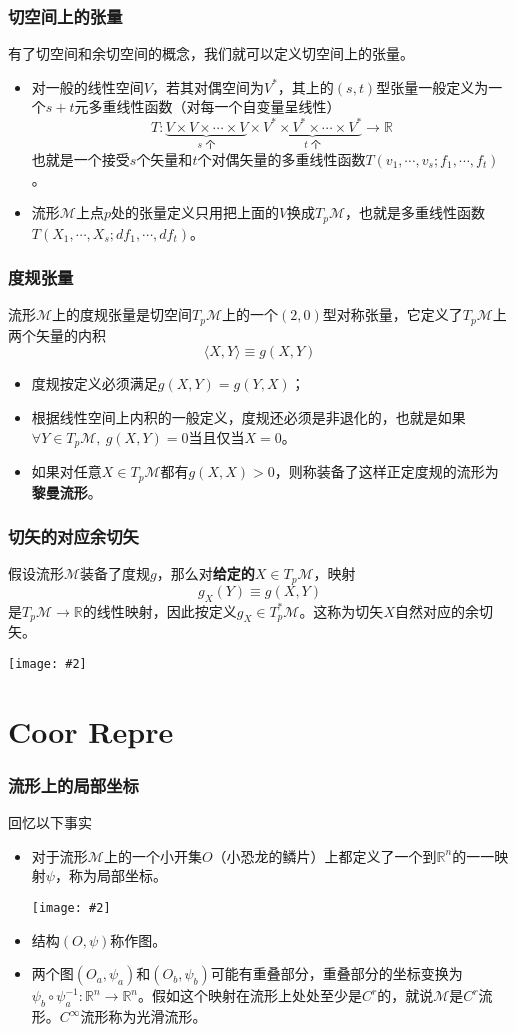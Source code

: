 \documentclass[CJK]{beamer}
\newcommand{\reals}{\mathbb{R}}
\newcommand{\mani}{\mathcal{M}}
\newcommand{\cpic}[2]{
\begin{center}
\texttt{[image: \#2]}
\end{center}
}
\begin{document}
\begin{frame}
\frametitle{\bch 切空间上的张量 \ech}
\bch
有了切空间和余切空间的概念，我们就可以定义切空间上的张量。
\begin{itemize}
\item 对一般的线性空间$V$，若其对偶空间为$V^*$，其上的$(s,t)$型张量一般定义为一个$s+t$元多重线性函数（对每一个自变量呈线性）{\color{blue}
$$
T:\underbrace{V\times V\times \cdots \times V}_{s\text{ 个}} \times  \underbrace{V^* \times V^* \times \cdots \times V^*}_{t\text{ 个}} \to \reals
$$}
也就是一个接受$s$个矢量和$t$个对偶矢量的多重线性函数$T(v_1,\cdots,v_s;f_1,\cdots,f_t)$。
\item 流形$\mani$上点$p$处的张量定义只用把上面的$V$换成$T_p\mani$，也就是多重线性函数$T(X_1,\cdots,X_s;df_1,\cdots,df_t)$。
\end{itemize}
\ech
\end{frame}

\begin{frame}
\frametitle{\bch 度规张量 \ech}
\bch
流形$\mani$上的度规张量是切空间$T_p\mani$上的一个$(2,0)$型对称张量，它定义了$T_p \mani$上两个矢量的内积
$$
\langle X,Y\rangle \equiv g(X,Y)
$$
\begin{itemize}
\item 度规按定义必须满足$g(X,Y) = g(Y,X)$；
\item 根据线性空间上内积的一般定义，度规还必须是非退化的，也就是如果$\forall Y \in T_p\mani,\ g(X,Y) = 0$当且仅当$X=0$。
\item 如果对任意$X\in T_p\mani$都有$g(X,X) > 0$，则称装备了这样正定度规的流形为{\bf \color{purple}黎曼流形}。
\end{itemize}
\ech
\end{frame}

\begin{frame}
\frametitle{\bch 切矢的对应余切矢 \ech}
\bch
假设流形$\mani$装备了度规$g$，那么对{\bf \color{red}给定的}$X\in T_p \mani$，映射
$$
g_X(Y) \equiv g(X,Y)
$$
是$T_p \mani \to \reals$的线性映射，因此按定义$g_X \in T_p^* \mani$。这称为切矢$X$自然对应的余切矢。
\cpic{0.15}{eat}
\ech
\end{frame}

\section{Coor Repre}
\begin{frame}
\frametitle{\bch 流形上的局部坐标 \ech}
\bch
回忆以下事实
\begin{itemize}
\item
对于流形$\mani$上的一个小开集$O$（小恐龙的鳞片）上都定义了一个到$\reals^n$的一一映射$\psi$，称为局部坐标。
\cpic{0.15}{dina}
\item
结构$(O,\psi)$称作图。
\item
两个图$(O_a,\psi_a)$和$(O_b,\psi_b)$可能有重叠部分，重叠部分的坐标变换为$\psi_b \circ \psi_a^{-1}: \reals^n \to \reals^n$。假如这个映射在流形上处处至少是$C^r$的，就说$\mani$是$C^r$流形。$C^\infty$流形称为光滑流形。
\end{itemize}
\ech
\end{frame}
\end{document}

